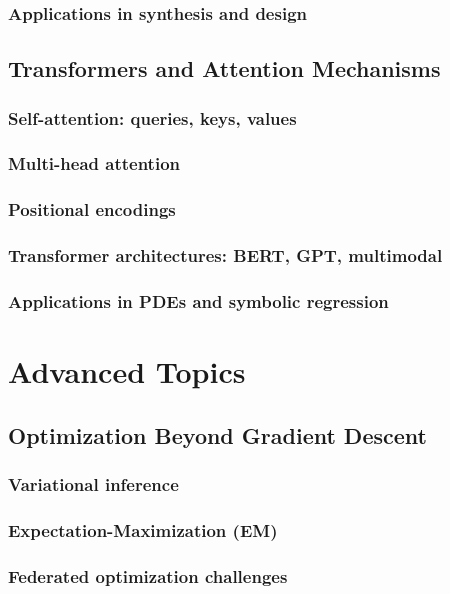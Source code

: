 \section{Applications in synthesis and design}

\chapter{Transformers and Attention Mechanisms}
\section{Self-attention: queries, keys, values}
\section{Multi-head attention}
\section{Positional encodings}
\section{Transformer architectures: BERT, GPT, multimodal}
\section{Applications in PDEs and symbolic regression}

\part{Advanced Topics}

\chapter{Optimization Beyond Gradient Descent}
\section{Variational inference}
\section{Expectation-Maximization (EM)}
\section{Federated optimization challenges}

